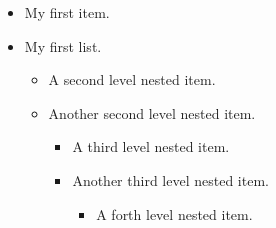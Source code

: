 \documentclass{article}
\begin{document}
\begin{itemize}
  \item My first item.
  \item My first list.
  \begin{itemize}
    \item A second level nested item.
    \item Another second level nested item.
    \begin{itemize}
      \item A third level nested item.
      \item Another third level nested item.
      \begin{itemize}
        \item A forth level nested item.
      \end{itemize}
    \end{itemize}
  \end{itemize}
\end{itemize}
\end{document}
